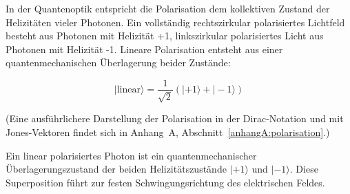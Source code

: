 \vspace{0.5em}
In der Quantenoptik entspricht die Polarisation dem kollektiven Zustand der Helizitäten vieler Photonen. Ein vollständig rechtszirkular polarisiertes Lichtfeld besteht aus Photonen mit Helizität +1, linkszirkular polarisiertes Licht aus Photonen mit Helizität -1. Lineare Polarisation entsteht aus einer quantenmechanischen Überlagerung beider Zustände:

\begin{equation}
	|\text{linear}\rangle = \frac{1}{\sqrt{2}} \left( |+1\rangle + |-1\rangle \right)
\end{equation}

(Eine ausführlichere Darstellung der Polarisation in der Dirac-Notation und mit Jones-Vektoren findet sich in Anhang~A, Abschnitt~\ref{anhangA:polarisation}.)
\vspace{1em}
\begin{tcolorbox}[physikbox, title=Superposition und Polarisation]
	\label{box:Superposition}
	Ein linear polarisiertes Photon ist ein quantenmechanischer Überlagerungszustand der beiden Helizitätszustände $|+1\rangle$ und $|-1\rangle$. Diese Superposition führt zur festen Schwingungsrichtung des elektrischen Feldes.
\end{tcolorbox}


